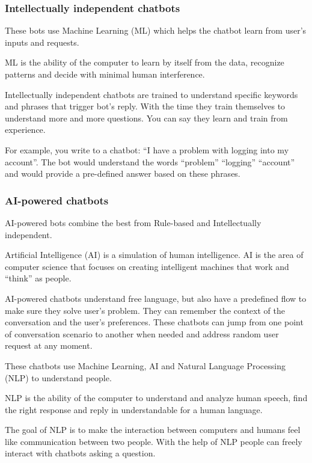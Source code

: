 \subsubsection{Intellectually independent chatbots}

These bots use Machine Learning (ML) which helps the chatbot learn from user’s inputs and requests.

ML is the ability of the computer to learn by itself from the data, recognize patterns and decide with minimal human interference.

Intellectually independent chatbots are trained to understand specific keywords and phrases that trigger bot’s reply. With the time they train themselves to understand more and more questions. You can say they learn and train from experience.

For example, you write to a chatbot: “I have a problem with logging into my account”. The bot would understand the words “problem” “logging” “account” and would provide a pre-defined answer based on these phrases.

\subsubsection{AI-powered chatbots}

AI-powered bots combine the best from Rule-based and Intellectually independent.

Artificial Intelligence (AI) is a simulation of human intelligence. AI is the area of computer science that focuses on creating intelligent machines that work and “think” as people.

AI-powered chatbots understand free language, but also have a predefined flow to make sure they solve user’s problem. They can remember the context of the conversation and the user’s preferences. These chatbots can jump from one point of conversation scenario to another when needed and address random user request at any moment.

These chatbots use Machine Learning, AI and Natural Language Processing (NLP) to understand people.

NLP is the ability of the computer to understand and analyze human speech, find the right response and reply in understandable for a human language.

The goal of NLP is to make the interaction between computers and humans feel like communication between two people. With the help of NLP people can freely interact with chatbots asking a question.

